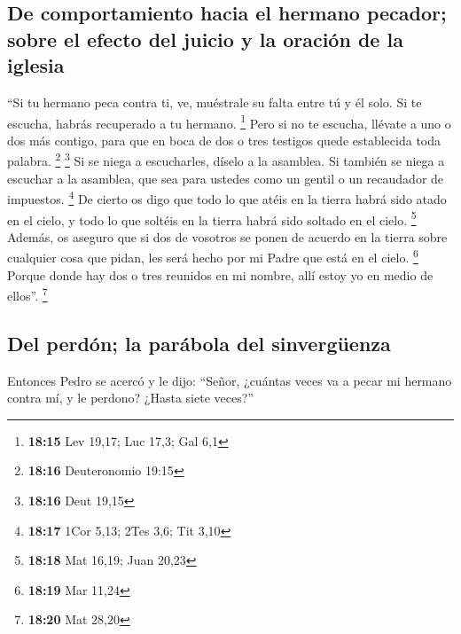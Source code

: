 \begin{paracol}{2}
\hypertarget{de-comportamiento-hacia-el-hermano-pecador-sobre-el-efecto-del-juicio-y-la-oraciuxf3n-de-la-iglesia}{%
\subsection{De comportamiento hacia el hermano pecador; sobre el efecto
del juicio y la oración de la
iglesia}\label{de-comportamiento-hacia-el-hermano-pecador-sobre-el-efecto-del-juicio-y-la-oraciuxf3n-de-la-iglesia}}

 ``Si tu hermano peca contra ti, ve, muéstrale su falta
entre tú y él solo. Si te escucha, habrás recuperado a tu hermano.
\footnote{\textbf{18:15} Lev 19,17; Luc 17,3; Gal 6,1} 
Pero si no te escucha, llévate a uno o dos más contigo, para que en boca
de dos o tres testigos quede establecida toda palabra. \footnote{\textbf{18:16}
  Deuteronomio 19:15} \footnote{\textbf{18:16} Deut 19,15}
 Si se niega a escucharles, díselo a la asamblea. Si
también se niega a escuchar a la asamblea, que sea para ustedes como un
gentil o un recaudador de impuestos. \footnote{\textbf{18:17} 1Cor 5,13;
  2Tes 3,6; Tit 3,10}  De cierto os digo que todo lo que
atéis en la tierra habrá sido atado en el cielo, y todo lo que soltéis
en la tierra habrá sido soltado en el cielo. \footnote{\textbf{18:18}
  Mat 16,19; Juan 20,23}  Además, os aseguro que si dos
de vosotros se ponen de acuerdo en la tierra sobre cualquier cosa que
pidan, les será hecho por mi Padre que está en el cielo. \footnote{\textbf{18:19}
  Mar 11,24}  Porque donde hay dos o tres reunidos en mi
nombre, allí estoy yo en medio de ellos''. \footnote{\textbf{18:20} Mat
  28,20}

\hypertarget{del-perduxf3n-la-paruxe1bola-del-sinverguxfcenza}{%
\subsection{Del perdón; la parábola del
sinvergüenza}\label{del-perduxf3n-la-paruxe1bola-del-sinverguxfcenza}}

 Entonces Pedro se acercó y le dijo: ``Señor, ¿cuántas
veces va a pecar mi hermano contra mí, y le perdono? ¿Hasta siete
veces?''


\end{paracol}
